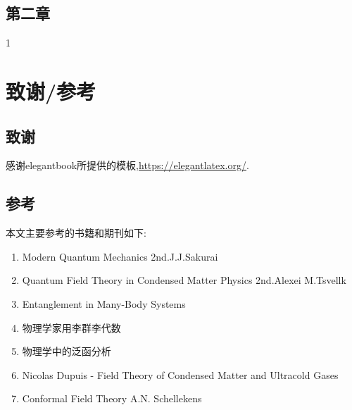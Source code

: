 \documentclass[lang=cn,newtx,10pt,scheme=chinese,thmcnt=section]{elegantbook}
\begin{document}
\section{第二章}
1
\chapter{致谢/参考}
\section{致谢}
感谢elegantbook所提供的模板,\href{https://elegantlatex.org/}{https://elegantlatex.org/}.\\

\section{参考}
本文主要参考的书籍和期刊如下:
\begin{enumerate}
	\item Modern Quantum Mechanics 2nd.J.J.Sakurai
	\item Quantum Field Theory in Condensed Matter Physics 2nd.Alexei M.Tsvellk
	\item Entanglement in Many-Body Systems
	\item 物理学家用李群李代数
	\item 物理学中的泛函分析
	\item Nicolas Dupuis - Field Theory of Condensed Matter and Ultracold Gases
	\item Conformal Field Theory A.N. Schellekens
\end{enumerate}
\end{document}
